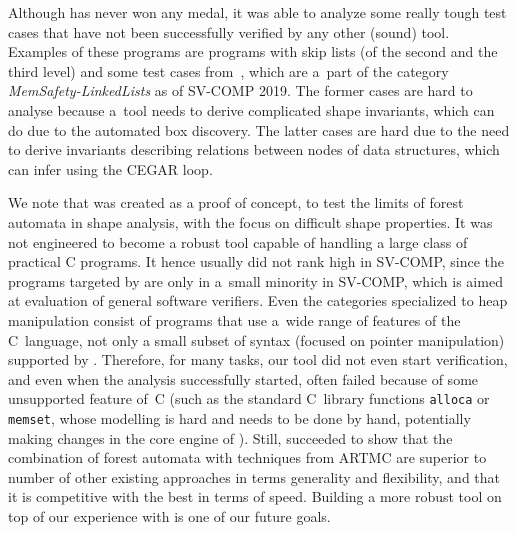 {Although \forester{} has never won any medal, it was able to analyze
some really tough test cases that have not been successfully verified by any
other (sound) tool.
Examples of these programs are programs with skip lists (of the second and the
third level) and some test cases from~\cite{vmcai17}, which are a~part of the
category \emph{MemSafety-LinkedLists} as of SV-COMP 2019.
The former cases are hard to analyse because a~tool needs to derive
complicated shape invariants, which \forester{} can do due to the automated
box discovery.
The latter cases are hard due to the need to derive invariants describing relations
between nodes of data structures, which \forester{} can infer using the CEGAR
loop.

We note that \forester was created as a proof of concept, to test the limits of forest automata in shape analysis,
with the focus on difficult shape properties. 
It was not engineered to become a robust tool capable of handling a large class of practical C programs. 
%
It hence usually did not rank high in SV-COMP, since the programs
targeted by \forester are only in a~small minority in SV-COMP, which is aimed at
evaluation of general software verifiers.
Even the categories specialized to heap manipulation consist of programs that
use a~wide range of features of the C~language, not only a small subset of syntax
(focused on pointer manipulation) supported by \forester{}.
Therefore, for many tasks, our tool did not even start verification, and even
when the analysis successfully started, \forester{} often failed because
of some unsupported feature of~C (such as the standard C~library functions
\texttt{alloca} or \texttt{memset}, whose modelling is hard and needs to be done by
hand, potentially making changes in the core engine of \forester).
%
Still, \forester succeeded to show that the combination of forest automata with techniques from ARTMC are superior to number of other existing approaches in terms generality and flexibility, and that it is competitive with the best in terms of speed.
%
Building a more robust tool on top of our experience with \forester is one of our future goals.


}

